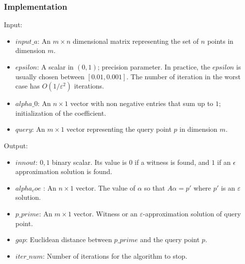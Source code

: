\documentclass[a4paper,12pt]{article}
\begin{document}

\subsubsection*{Implementation}

\noindent Input:
\begin{itemize}
	\item {$input\_a$:}
	 An $m \times n$ dimensional matrix representing the set of $n$ points in dimension $m$.
	\item {$epsilon$:}
	A scalar in $(0,1)$; precision parameter. In practice, the $epsilon$ is usually chosen between $[0.01,0.001]$. The number of iteration in the worst case has $O(1/\varepsilon^2)$ iterations.
	\item {$alpha\_0$:}
	 An $n\times 1$ vector with non negative entries that sum up to $1$; initialization of the coefficient.
	\item {$query$:}
	 An $m\times 1$ vector representing the query point $p$ in dimension $m$.
\end{itemize}
Output:
\begin{itemize}
	\item {$innout$:}
${0,1}$ binary scalar. Its value is $0$ if a witness is found, and $1$ if an $\epsilon$ approximation solution is found.  
\item {$alpha_coe$ :}
An $n\times 1$ vector. The value of $\alpha$ so that $A\alpha=p'$ where $p'$ is an $\varepsilon$ solution.
\item {$p\_prime$:}
An $m\times1$ vector. Witness or an $\varepsilon$-approximation solution of query point.
\item {$gap$:}
Euclidean distance between $p\_prime$ and the query point $p$.
\item {$iter\_num$:}
Number of iterations for the  algorithm to stop.
\end{itemize}
\end{document}
